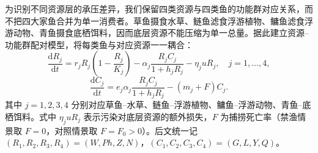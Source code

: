 为识别不同资源层的承压差异，我们保留四类资源与四类鱼的功能群对应关系，而不把四大家鱼合并为单一消费者。草鱼摄食水草、鲢鱼滤食浮游植物、鳙鱼滤食浮游动物、青鱼摄食底栖饵料，因而底层资源不能压缩为单一总量。据此建立资源--功能群配对模型，将每类鱼与对应资源一一耦合：
\begin{equation}
\frac{\mathrm{d}R_j}{\mathrm{d}t}
=r_j R_j\left(1-\frac{R_j}{K_j}\right)-\alpha_j\frac{R_j C_j}{1+h_jR_j}-\eta_j u R_j,\quad j=1,\dots,4,
\end{equation}
\begin{equation}
\frac{\mathrm{d}C_j}{\mathrm{d}t}
=e_j\alpha_j\frac{R_j C_j}{1+h_jR_j}-(m_j+F)C_j.
\end{equation}
其中 $j=1,2,3,4$ 分别对应草鱼--水草、鲢鱼--浮游植物、鳙鱼--浮游动物、青鱼--底栖饵料。式中 $\eta_j u R_j$ 表示污染对底层资源的额外损失，$F$ 为捕捞死亡率（禁渔情景取 $F=0$，对照情景取 $F=F_0>0$）。后文统一记 $(R_1,R_2,R_3,R_4)=(W,Ph,Z,N)$，$(C_1,C_2,C_3,C_4)=(G,L,Y,Q)$。
